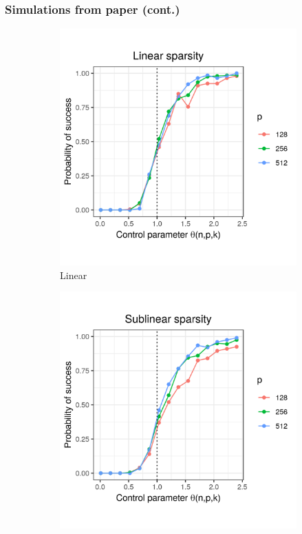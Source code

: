 \documentclass{beamer}
\begin{document}
\begin{frame}
\frametitle{Simulations from paper (cont.)}

\begin{figure}[h]
  \centering
  \begin{subfigure}{0.32\textwidth}
    \includegraphics[width=0.9\linewidth]{uniform_linear_sparsity_alpha_1}
    \caption{Linear}
  \end{subfigure}
  \begin{subfigure}{0.32\textwidth}
    \includegraphics[width=0.9\linewidth]{uniform_sublinear_sparsity_alpha_1}

\end{subfigure}
\end{figure}
\end{frame}
\end{document}
